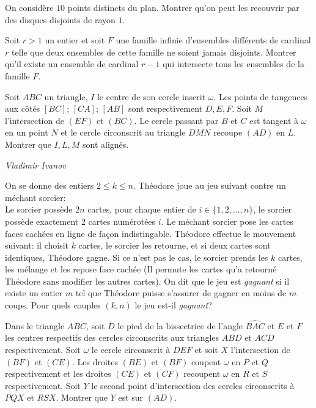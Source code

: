 \begin{exo}{}
On considère $10$ points distincts du plan. Montrer qu'on peut les recouvrir par des disques disjoints de rayon $1$.
\end{exo}

\begin{exo}{}
Soit $r>1$ un entier et soit $F$ une famille infinie d'ensembles différents de cardinal $r$ telle que deux ensembles de cette famille ne soient jamais disjoints. Montrer qu'il existe un ensemble de cardinal $r-1$ qui intersecte tous les ensembles de la famille $F$.
\end{exo}


\begin{exo}{}
Soit $ABC$ un triangle, $I$ le centre de son cercle inscrit $\omega$. Les points de tangences
aux côtés  $[BC]$; $[CA]$; $[AB]$ sont respectivement $D,E, F$. Soit $M$ l’intersection de $(EF)$ et $(BC)$.
Le cercle passant par $B$ et $C$ est tangent à $\omega$ en un point $N$ et le cercle circonscrit au triangle
$DMN$ recoupe $(AD)$ en $L$. Montrer que $I,L,M$ sont alignés.

\medskip
\textit{Vladimir Ivanov}
\end{exo}




\begin{exo}{}
On se donne des entiers $2\le k\le n$. Théodore joue au jeu suivant contre un méchant sorcier: \\
Le sorcier possède $2n$ cartes, pour chaque entier de $i\in \{1,2,...,n\}$, le sorcier possède exactement $2$ cartes numérotées $i$. Le méchant sorcier pose les cartes faces cachées en ligne de façon indistingable. Théodore effectue le mouvement suivant: il choisit $k$ cartes, le sorcier les retourne, et si deux cartes sont identiques, Théodore gagne. Si ce n'est pas le cas, le sorcier prends les $k$ cartes, les mélange et les repose face cachée (Il permute les cartes qu'a retourné Théodore sans modifier les autres cartes). On dit que le jeu est \textit{gagnant} si il existe un entier $m$ tel que Théodore puisse s'assurer de gagner en moins de $m$ coups. Pour quels couples $(k,n)$ le jeu est-il \textit{gagnant}?

\end{exo}

\begin{exo}{}
Dans le triangle $ABC$, soit $D$ le pied de la bissectrice de l'angle $\widehat{BAC}$ et $E$ et $F$ les centres respectifs des cercles circonscrits aux triangles $ABD$ et $ACD$ respectivement. Soit $\omega$ le cercle circonscrit à $DEF$ et soit $X$  l'intersection de $(BF)$ et $(CE)$. Les droites $(BE)$ et $(BF)$ coupent $\omega$ en $P$  et $Q$ respectivement et les droites $(CE)$ et $(CF)$ recoupent $\omega$ en $R$ et $S$ respectivement. Soit $Y$ le second point d'intersection des cercles circonscrits à $PQX$ et $RSX$. Montrer que $Y$ est sur $(AD)$.
\end{exo}


